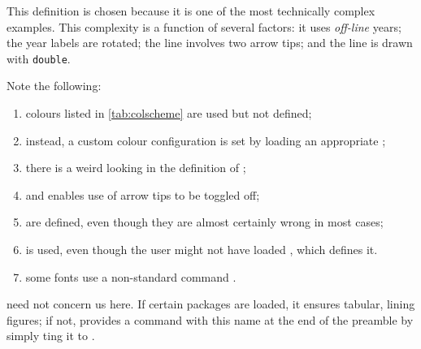 \documentclass[10pt,british,a4paper]{ltxdoc}
\newcommand*\pkg[1]{\textpkg{#1}}
\begin{document}
This definition is chosen because it is one of the most technically complex examples.
This complexity is a function of several factors: it uses \emph{off-line} years; the year labels are rotated; the line involves two arrow tips; and the line is drawn with \texttt{double}.

Note the following:
\begin{enumerate}
  \item\label{item:col-use} colours listed in \cref{tab:colscheme} are used but not defined;
  \item\label{item:custom-col} instead, a custom colour configuration is set by loading an appropriate \colschemelabelname{};
  \item\label{item:weird-i} there is a weird looking  in the definition of ;
  \item\label{item:timeline-arrow}  and  enables use of arrow tips to be toggled off;
  \item\label{item:def-dyddiadau}  are defined, even though they are almost certainly wrong in most cases;
  \item\label{item:meaning2context}  is used, even though the user might not have loaded \pkg{memoize}, which defines it.
  \item\label{item:tlstyle} some fonts use a non-standard command .
\end{enumerate}

 need not concern us here.
If certain packages are loaded, it ensures tabular, lining figures; if not, \pkg{chronos} provides a command with this name at the end of the preamble by simply ting it to .
\end{document}
